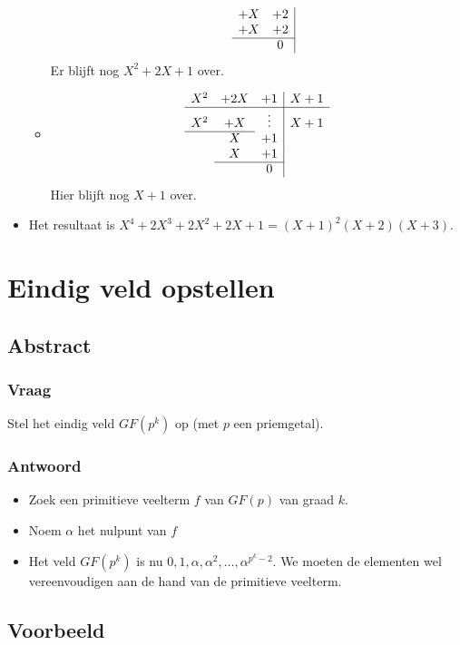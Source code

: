 \documentclass[main.tex]{subfiles}
\begin{document}
\begin{itemize}
\begin{itemize}
\[\begin{array}{cccc|c}
           &       &+X     &+2       &\\
           &       &+X     &+2       &\\\cline{3-4}
           &       &       &0        &\\
    \end{array}
    \]
    Er blijft nog $X^{2}+2X+1$ over.
  \item 
    \[
    \begin{array}{ccc|c}
      X^{2} &+2X &+1     & X+1\\\hline
      X^{2} &+X  &\vdots & X+1\\\cline{1-2}
           & X  &+1     &\\
           & X  &+1     &\\\cline{2-3}
           &    &0      &\\
    \end{array}
    \]
    Hier blijft nog $X+1$ over.
  \end{itemize}
\item Het resultaat is $X^{4} + 2X^{3} + 2X^{2} + 2X + 1 = (X+1)^{2}(X+2)(X+3)$.
\end{itemize}

\newpage
\section{Eindig veld opstellen}
\subsection*{Abstract}
\subsubsection*{Vraag}
Stel het eindig veld $GF(p^{k})$ op (met $p$ een priemgetal).
\subsubsection*{Antwoord}
\begin{itemize}
\item Zoek een primitieve veelterm $f$ van $GF(p)$ van graad $k$.
\item Noem $\alpha$ het nulpunt van $f$
\item Het veld $GF(p^{k})$ is nu $0,1,\alpha,\alpha^{2},\dotsc,\alpha^{p^{k}-2}$.
  We moeten de elementen wel vereenvoudigen aan de hand van de primitieve veelterm.
\end{itemize}
\subsection*{Voorbeeld}
\end{document}

